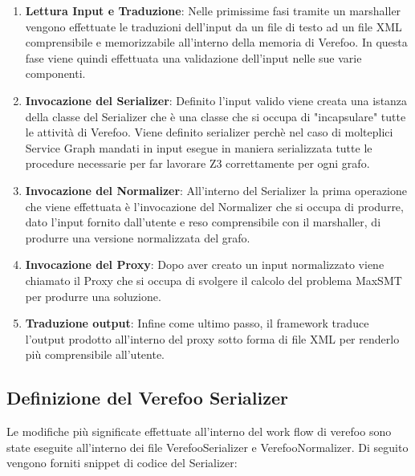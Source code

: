 \begin{enumerate}
    \item \textbf{Lettura Input e Traduzione}: Nelle primissime fasi tramite un marshaller vengono effettuate le traduzioni dell'input da un file di testo ad un file XML comprensibile e memorizzabile all'interno della memoria di Verefoo. In questa fase viene quindi effettuata 
        una validazione dell'input nelle sue varie componenti.  
    \item  \textbf{Invocazione del Serializer}: Definito l'input valido viene creata una istanza della classe del Serializer che è una classe che si occupa di "incapsulare" tutte le attività di Verefoo. Viene definito serializer perchè
        nel caso di molteplici Service Graph mandati in input esegue in maniera serializzata tutte le procedure necessarie per far lavorare Z3 correttamente per ogni grafo.
    \item \textbf{Invocazione del Normalizer}: All'interno del Serializer la prima operazione che viene effettuata è l'invocazione del Normalizer che si occupa di produrre, dato l'input fornito dall'utente e reso comprensibile con il marshaller, di produrre una versione normalizzata del grafo.
    \item \textbf{Invocazione del Proxy}: Dopo aver creato un input normalizzato viene chiamato il Proxy che si occupa di svolgere il calcolo del problema MaxSMT per produrre una soluzione.
    \item \textbf{Traduzione output}: Infine come ultimo passo, il framework traduce l'output prodotto all'interno del proxy sotto forma di file XML per renderlo più comprensibile all'utente.
\end{enumerate}

\subsection{Definizione del Verefoo Serializer}
Le modifiche più significate effettuate all'interno del work flow di verefoo sono state eseguite all'interno dei file VerefooSerializer e VerefooNormalizer.
Di seguito vengono forniti snippet di codice del Serializer:

\lstset{language=Java} %

